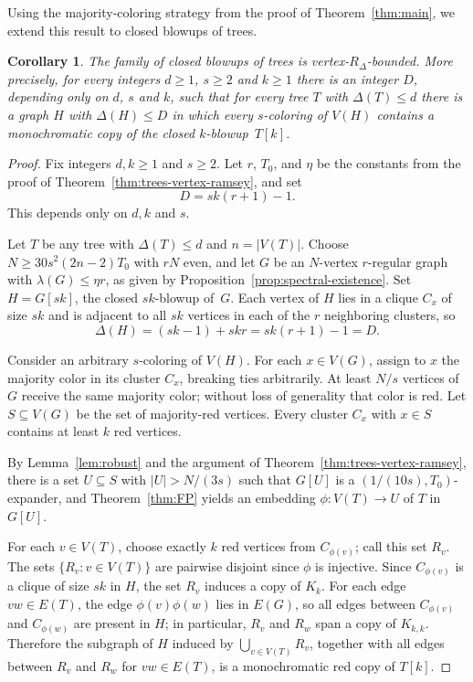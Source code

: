 \documentclass[11pt]{article}
\newtheorem{corollary}[theorem]{Corollary}
\theoremstyle{definition}
\begin{document}
Using the majority-coloring strategy from the proof of
Theorem~\ref{thm:main}, we extend this result to closed blowups of trees.

\begin{corollary}\label{cor:blowups-vertex-ramsey}
The family of closed blowups of trees is vertex-$R_\Delta$-bounded. More precisely, for every integers $d \ge 1$, $s\ge2$ and $k \ge 1$ there is an integer $D$, depending only on $d$, $s$ and $k$, such that for every tree $T$ with $\Delta(T) \le d$ there is a graph $H$ with $\Delta(H) \le D$ in which every $s$-coloring of $V(H)$ contains a monochromatic copy of the closed $k$-blowup~$T[k]$.
\end{corollary}

\begin{proof}
Fix integers $d,k \ge 1$ and $s\ge2$. Let $r$, $T_0$, and $\eta$ be the constants from the proof of Theorem~\ref{thm:trees-vertex-ramsey}, and set
\[
  D = sk(r+1)-1.
\]
This depends only on $d,k$ and $s$.

Let $T$ be any tree with $\Delta(T) \le d$ and $n = |V(T)|$. Choose $N \ge 30s^2(2n-2)T_0$ with $rN$ even, and let $G$ be an $N$-vertex $r$-regular graph with $\lambda(G) \le \eta r$, as given by Proposition~\ref{prop:spectral-existence}. Set $H = G[sk]$, the closed $sk$-blowup of~$G$. Each vertex of $H$ lies in a clique $C_x$ of size $sk$ and is adjacent to all $sk$ vertices in each of the $r$ neighboring clusters, so
\[
  \Delta(H) = (sk-1) + skr = sk(r+1)-1 = D.
\]

Consider an arbitrary  $s$-coloring of $V(H)$. For each $x \in
V(G)$, assign to $x$ the majority color in its cluster $C_x$, breaking
ties arbitrarily. At least $N/s$ vertices of $G$ receive the same majority color; without loss of generality that color is red. Let $S\subseteq V(G)$ be the set of majority-red vertices. Every cluster $C_x$ with $x \in S$ contains at least $k$ red vertices.

By Lemma~\ref{lem:robust} and the argument of Theorem~\ref{thm:trees-vertex-ramsey}, there is a set $U \subseteq S$ with $|U| > N/(3s)$ such that $G[U]$ is a $(1/(10s),T_0)$-expander, and Theorem~\ref{thm:FP} yields an embedding $\phi \colon V(T) \to U$ of $T$ in $G[U]$.

For each $v \in V(T)$, choose exactly $k$ red vertices from
$C_{\phi(v)}$; call this set $R_v$. The sets $\{R_v : v \in V(T)\}$ are
pairwise disjoint since $\phi$ is injective. Since $C_{\phi(v)}$ is a
clique of size $sk$ in $H$, the set $R_v$ induces a copy of $K_k$.
For each edge $vw \in E(T)$, the edge $\phi(v)\phi(w)$ lies in $E(G)$,
so all edges between $C_{\phi(v)}$ and $C_{\phi(w)}$ are present in $H$;
in particular, $R_v$ and $R_w$ span a copy of $K_{k,k}$. Therefore the
subgraph of $H$ induced by $\bigcup_{v \in V(T)} R_v$, together with all
edges between $R_v$ and $R_w$ for $vw \in E(T)$, is a monochromatic red
copy of $T[k]$.
\end{proof}
\end{document}
